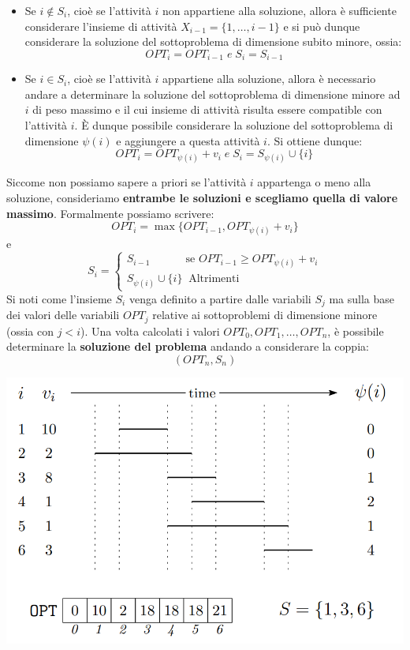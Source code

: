 \documentclass[12pt]{article}
\begin{document}
\begin{itemize}
    \item Se $i \notin S_i$, cioè se l'attività $i$ non appartiene alla soluzione, allora è sufficiente considerare l'insieme di attività $X_{i-1} = \{1,\dots, i-1\}$ e si può dunque considerare la soluzione del sottoproblema di dimensione subito minore, ossia:
    $$OPT_i = OPT_{i-1} \; e \; S_i = S_{i-1}$$
    \item Se $i \in S_i$, cioè se l'attività $i$ appartiene alla soluzione, allora è necessario andare a determinare la soluzione del sottoproblema di dimensione minore ad $i$ di peso massimo e il cui insieme di attività risulta essere compatible con l'attività $i$.
    È dunque possibile considerare la soluzione del sottoproblema di dimensione $\psi(i)$ e aggiungere a questa attività $i$. Si ottiene dunque:
    $$OPT_i = OPT_{\psi(i)} + v_i \; e \; S_i = S_{\psi(i)} \cup \{i\}$$
\end{itemize}
Siccome non possiamo sapere a priori se l'attività $i$ appartenga o meno alla soluzione, consideriamo \textbf{entrambe le soluzioni e scegliamo quella di valore massimo}.
Formalmente possiamo scrivere:
$$OPT_i = \max\{OPT_{i-1}, OPT_{\psi(i)} + v_i\}$$
e
$$S_i = \begin{cases}
    S_{i-1} \; \; \, \; \; \; \; \; \; \; \; \; \textrm{se } OPT_{i-1} \geq OPT_{\psi(i)} + v_i \\
    S_{\psi(i)} \cup \{i\} \; \; \textrm{Altrimenti}
\end{cases}$$
Si noti come l'insieme $S_i$ venga definito a partire dalle variabili $S_j$ ma sulla base dei valori delle variabili $OPT_j$ relative ai sottoproblemi di dimensione minore (ossia con $j < i$).
Una volta calcolati i valori $OPT_0, OPT_1, \dots, OPT_n$, è possibile determinare la \textbf{soluzione del problema} andando a considerare la coppia:
$$(OPT_n, S_n)$$
\begin{center}
    \includegraphics[width = 0.60\linewidth]{Images/7.png}
\end{center}
\end{document}

